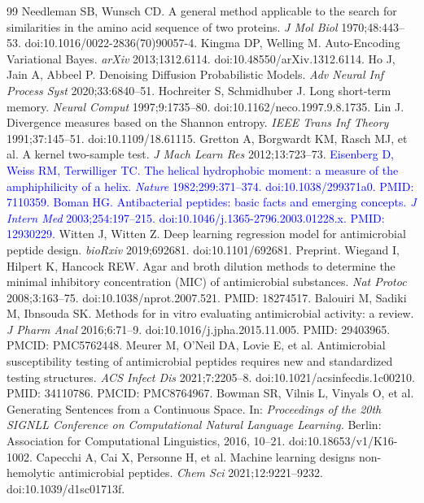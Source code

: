 \documentclass[unnumsec,webpdf,contemporary,large]{oup-authoring-template}
\newcommand{\rev}[1]{\textcolor{blue}{#1}}
\begin{document}
\begin{thebibliography}{99}
 Needleman SB, Wunsch CD. A general method applicable to the search for similarities in the amino acid sequence of two proteins. \textit{J Mol Biol} 1970;48:443--53. doi:10.1016/0022-2836(70)90057-4.
 Kingma DP, Welling M. Auto-Encoding Variational Bayes. \textit{arXiv} 2013;1312.6114. doi:10.48550/arXiv.1312.6114.
 Ho J, Jain A, Abbeel P. Denoising Diffusion Probabilistic Models. \textit{Adv Neural Inf Process Syst} 2020;33:6840--51.
 Hochreiter S, Schmidhuber J. Long short-term memory. \textit{Neural Comput} 1997;9:1735--80. doi:10.1162/neco.1997.9.8.1735.
 Lin J. Divergence measures based on the Shannon entropy. \textit{IEEE Trans Inf Theory} 1991;37:145--51. doi:10.1109/18.61115.
 Gretton A, Borgwardt KM, Rasch MJ, et al. A kernel two-sample test. \textit{J Mach Learn Res} 2012;13:723--73.
 \rev{Eisenberg D, Weiss RM, Terwilliger TC. The helical hydrophobic moment: a measure of the amphiphilicity of a helix. \textit{Nature} 1982;299:371--374. doi:10.1038/299371a0. PMID: 7110359.}
 \rev{Boman HG. Antibacterial peptides: basic facts and emerging concepts. \textit{J Intern Med} 2003;254:197--215. doi:10.1046/j.1365-2796.2003.01228.x. PMID: 12930229.}
 Witten J, Witten Z. Deep learning regression model for antimicrobial peptide design. \textit{bioRxiv} 2019;692681. doi:10.1101/692681. Preprint.
 Wiegand I, Hilpert K, Hancock REW. Agar and broth dilution methods to determine the minimal inhibitory concentration (MIC) of antimicrobial substances. \textit{Nat Protoc} 2008;3:163--75. doi:10.1038/nprot.2007.521. PMID: 18274517.
 Balouiri M, Sadiki M, Ibnsouda SK. Methods for in vitro evaluating antimicrobial activity: a review. \textit{J Pharm Anal} 2016;6:71--9. doi:10.1016/j.jpha.2015.11.005. PMID: 29403965. PMCID: PMC5762448.
 Meurer M, O'Neil DA, Lovie E, et al. Antimicrobial susceptibility testing of antimicrobial peptides requires new and standardized testing structures. \textit{ACS Infect Dis} 2021;7:2205--8. doi:10.1021/acsinfecdis.1c00210. PMID: 34110786. PMCID: PMC8764967.
 Bowman SR, Vilnis L, Vinyals O, et al. Generating Sentences from a Continuous Space. In: \textit{Proceedings of the 20th SIGNLL Conference on Computational Natural Language Learning.} Berlin: Association for Computational Linguistics, 2016, 10--21. doi:10.18653/v1/K16-1002.
 Capecchi A, Cai X, Personne H, et al. Machine learning designs non-hemolytic antimicrobial peptides. \textit{Chem Sci} 2021;12:9221--9232. doi:10.1039/d1sc01713f.

\end{thebibliography}
\end{document}
